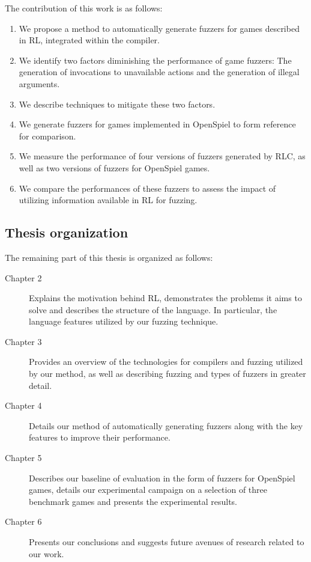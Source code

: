 The contribution of this work is as follows:
\begin{enumerate}
    \item We propose a method to automatically generate fuzzers for games described in RL, integrated within the compiler.
    \item We identify two factors diminishing the performance of game fuzzers: The generation of invocations to unavailable actions and the generation of illegal arguments.
    \item We describe techniques to mitigate these two factors.
    \item We generate fuzzers for games implemented in OpenSpiel to form reference for comparison.
    \item We measure the performance of four versions of fuzzers generated by RLC, as well as two versions of fuzzers for OpenSpiel games.
    \item We compare the performances of these fuzzers to assess the impact of utilizing information available in RL for fuzzing.
\end{enumerate}

\subsection*{Thesis organization}
The remaining part of this thesis is organized as follows:
\begin{description}
    \item [Chapter 2] Explains the motivation behind RL, demonstrates the problems it aims to solve and describes the structure of the language. In particular, the language features utilized by our fuzzing technique.
    \item [Chapter 3] Provides an overview of the technologies for compilers and fuzzing utilized by our method, as well as describing fuzzing and types of fuzzers in greater detail.
    \item [Chapter 4] Details our method of automatically generating fuzzers along with the key features to improve their performance.
    \item [Chapter 5] Describes our baseline of evaluation in the form of fuzzers for OpenSpiel games, details our experimental campaign on a selection of three benchmark games and presents the experimental results.
    \item [Chapter 6] Presents our conclusions and suggests future avenues of research related to our work. 
\end{description}
